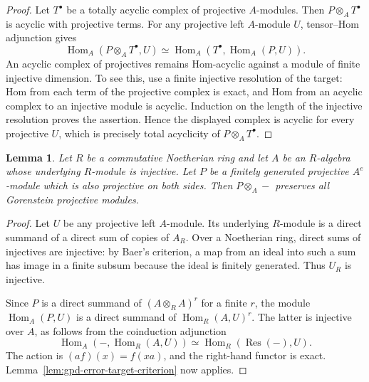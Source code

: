 \documentclass[12pt,a4paper,english,reqno]{amsart}
\numberwithin{equation}{section}
\theoremstyle{plain}
\newtheorem{lemma}[theorem]{Lemma}
\theoremstyle{definition}
\begin{document}
\begin{proof}
Let $T^\bullet$ be a totally acyclic complex of projective
$A$-modules.  Then $P\otimes_AT^\bullet$ is acyclic with projective
terms.  For any projective left $A$-module $U$, tensor--Hom
adjunction gives
\[
 \operatorname{Hom}_A(P\otimes_AT^\bullet,U)
 \simeq
 \operatorname{Hom}_A(T^\bullet,\operatorname{Hom}_A(P,U)).
\]
An acyclic complex of projectives remains Hom-acyclic against a
module of finite injective dimension.  To see this, use a finite
injective resolution of the target: Hom from each term of the
projective complex is exact, and Hom from an acyclic complex to an
injective module is acyclic.  Induction on the length of the
injective resolution proves the assertion.  Hence the displayed
complex is acyclic for every projective $U$, which is precisely
total acyclicity of $P\otimes_AT^\bullet$.
\end{proof}

\begin{lemma}
\label{lem:gpd-base-injective-error}
Let $R$ be a commutative Noetherian ring and let $A$ be an $R$-algebra
whose underlying $R$-module is injective.  Let $P$ be a finitely
generated projective $A^e$-module which is also projective on both
sides.  Then $P\otimes_A-$ preserves all Gorenstein projective modules.
\end{lemma}

\begin{proof}
Let $U$ be any projective left $A$-module.  Its underlying $R$-module
is a direct summand of a direct sum of copies of $A_R$.  Over a
Noetherian ring, direct sums of injectives are injective: by Baer's
criterion, a map from an ideal into such a sum has image in a finite
subsum because the ideal is finitely generated.  Thus $U_R$ is
injective.

Since $P$ is a direct summand of $(A\otimes_R A)^r$ for a finite $r$,
the module $\operatorname{Hom}_A(P,U)$ is a direct summand of
$\operatorname{Hom}_R(A,U)^r$.  The latter is injective over $A$,
as follows from the coinduction adjunction
\[
 \operatorname{Hom}_A(-,\operatorname{Hom}_R(A,U))
 \simeq \operatorname{Hom}_R(\operatorname{Res}(-),U).
\]
The action is $(a f)(x)=f(xa)$, and the right-hand functor is exact.
Lemma~\ref{lem:gpd-error-target-criterion} now applies.
\end{proof}
\end{document}
